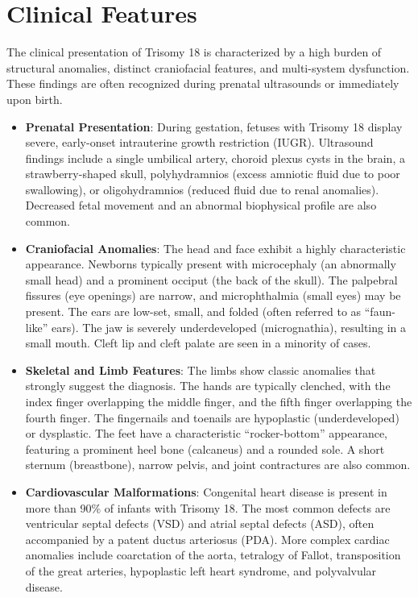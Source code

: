 \section*{Clinical Features}
The clinical presentation of Trisomy 18 is characterized by a high burden of structural anomalies, distinct craniofacial features, and multi-system dysfunction. These findings are often recognized during prenatal ultrasounds or immediately upon birth.
\begin{itemize}
    \item \textbf{Prenatal Presentation}: During gestation, fetuses with Trisomy 18 display severe, early-onset intrauterine growth restriction (IUGR). Ultrasound findings include a single umbilical artery, choroid plexus cysts in the brain, a strawberry-shaped skull, polyhydramnios (excess amniotic fluid due to poor swallowing), or oligohydramnios (reduced fluid due to renal anomalies). Decreased fetal movement and an abnormal biophysical profile are also common.
    \item \textbf{Craniofacial Anomalies}: The head and face exhibit a highly characteristic appearance. Newborns typically present with microcephaly (an abnormally small head) and a prominent occiput (the back of the skull). The palpebral fissures (eye openings) are narrow, and microphthalmia (small eyes) may be present. The ears are low-set, small, and folded (often referred to as ``faun-like'' ears). The jaw is severely underdeveloped (micrognathia), resulting in a small mouth. Cleft lip and cleft palate are seen in a minority of cases.
    \item \textbf{Skeletal and Limb Features}: The limbs show classic anomalies that strongly suggest the diagnosis. The hands are typically clenched, with the index finger overlapping the middle finger, and the fifth finger overlapping the fourth finger. The fingernails and toenails are hypoplastic (underdeveloped) or dysplastic. The feet have a characteristic ``rocker-bottom'' appearance, featuring a prominent heel bone (calcaneus) and a rounded sole. A short sternum (breastbone), narrow pelvis, and joint contractures are also common.
    \item \textbf{Cardiovascular Malformations}: Congenital heart disease is present in more than 90\% of infants with Trisomy 18. The most common defects are ventricular septal defects (VSD) and atrial septal defects (ASD), often accompanied by a patent ductus arteriosus (PDA). More complex cardiac anomalies include coarctation of the aorta, tetralogy of Fallot, transposition of the great arteries, hypoplastic left heart syndrome, and polyvalvular disease.

\end{itemize}
